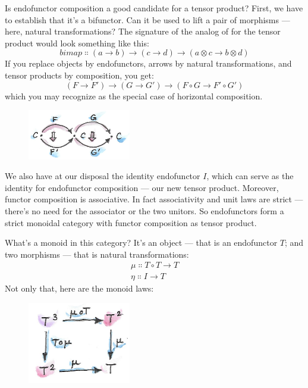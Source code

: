 Is endofunctor composition a good candidate for a tensor product? First,
we have to establish that it's a bifunctor. Can it be used to lift a
pair of morphisms --- here, natural transformations? The signature of
the analog of  for the tensor product would look something
like this:
\[\mathit{bimap} \Colon (a \to b) \to (c \to d) \to (a \otimes c \to b \otimes d)\]
If you replace objects by endofunctors, arrows by natural
transformations, and tensor products by composition, you get:
\[(F \to F') \to (G \to G') \to (F \circ G \to F' \circ G')\]
which you may recognize as the special case of horizontal composition.

\begin{figure}[H]
  \centering
  \includegraphics[width=0.4\textwidth]{images/horizcomp.png}
\end{figure}

\noindent
We also have at our disposal the identity endofunctor $I$, which
can serve as the identity for endofunctor composition --- our new tensor
product. Moreover, functor composition is associative. In fact
associativity and unit laws are strict --- there's no need for the
associator or the two unitors. So endofunctors form a strict monoidal
category with functor composition as tensor product.

What's a monoid in this category? It's an object --- that is an
endofunctor $T$; and two morphisms --- that is natural
transformations:
\begin{gather*}
  \mu \Colon T \circ T \to T \\
  \eta \Colon I \to T
\end{gather*}
Not only that, here are the monoid laws:

\begin{figure}[H]
  \centering
  \includegraphics[width=0.4\textwidth]{images/assoc.png}
\end{figure}

